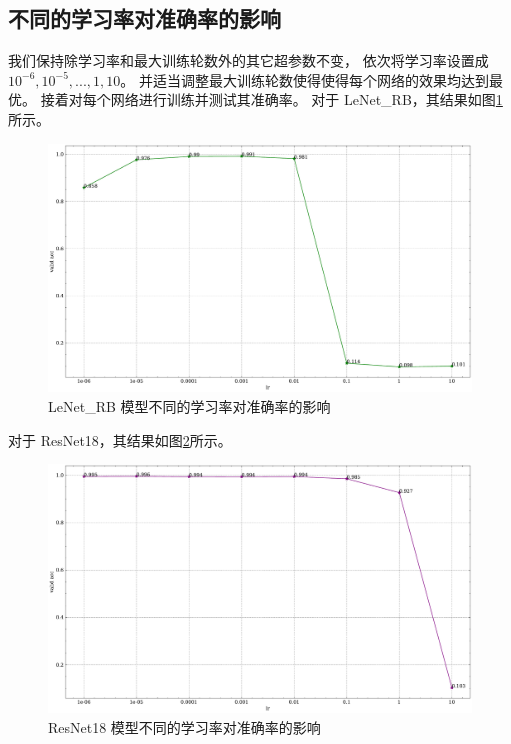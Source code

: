 \documentclass[supercite]{Experimental_Report}
\theoremstyle{definition}
\begin{document}
\subsection{不同的学习率对准确率的影响}
我们保持除学习率和最大训练轮数外的其它超参数不变，
依次将学习率设置成 $10^{-6}, 10^{-5}, ..., 1, 10$。
并适当调整最大训练轮数使得使得每个网络的效果均达到最优。
接着对每个网络进行训练并测试其准确率。
对于 LeNet\_RB，其结果如图\ref{LeNetRB不同的学习率}所示。
\begin{figure}[H]
	\begin{center}
		\includegraphics[scale=0.4]{../images/LeNetRB不同的学习率.pdf}
		\caption{LeNet\_RB 模型不同的学习率对准确率的影响}
		\label{LeNetRB不同的学习率}
	\end{center}
\end{figure}

对于 ResNet18，其结果如图\ref{ResNet18不同的学习率}所示。
\begin{figure}[H]
	\begin{center}
		\includegraphics[scale=0.4]{../images/ResNet18不同的学习率.pdf}
		\caption{ResNet18 模型不同的学习率对准确率的影响}
		\label{ResNet18不同的学习率}
	\end{center}
\end{figure}
\end{document}
